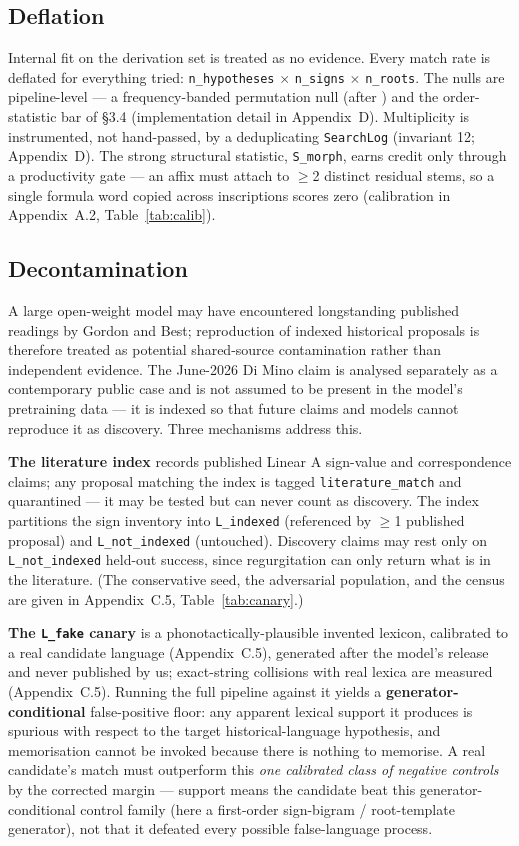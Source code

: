 \subsection{Deflation}

Internal fit on the derivation set is treated as no evidence. Every match
rate is deflated for everything tried: \texttt{n\_hypotheses} $\times$
\texttt{n\_signs} $\times$ \texttt{n\_roots}. The nulls are pipeline-level
--- a frequency-banded permutation null (after \citealp{packard1974}) and
the order-statistic bar of \S3.4 (implementation detail in Appendix~D).
Multiplicity is instrumented, not hand-passed, by a deduplicating
\texttt{SearchLog} (invariant 12; Appendix~D). The strong structural statistic,
\texttt{S\_morph}, earns credit only through a productivity gate --- an
affix must attach to $\ge$2 distinct residual stems, so a single formula
word copied across inscriptions scores zero (calibration in
Appendix~A.2, Table~\ref{tab:calib}).

\subsection{Decontamination}

A large open-weight model may have encountered longstanding published
readings by Gordon and Best; reproduction of indexed historical proposals
is therefore treated as potential shared-source contamination rather than
independent evidence. The June-2026 Di Mino claim is analysed separately
as a contemporary public case and is not assumed to be present in the
model's pretraining data --- it is indexed so that future claims and
models cannot reproduce it as discovery. Three mechanisms address this.

\textbf{The literature index} records published Linear A sign-value and
correspondence claims; any proposal matching the index is tagged
\texttt{literature\_match} and quarantined --- it may be tested but can
never count as discovery. The index partitions the sign inventory into
\texttt{L\_indexed} (referenced by $\ge$1 published proposal) and
\texttt{L\_not\_indexed} (untouched). Discovery claims may rest only on
\texttt{L\_not\_indexed} held-out success, since regurgitation can only
return what is in the literature. (The conservative seed, the adversarial
population, and the census are given in Appendix~C.5,
Table~\ref{tab:canary}.)

\textbf{The \texttt{L\_fake} canary} is a phonotactically-plausible
invented lexicon, calibrated to a real candidate language
(Appendix~C.5), generated after the model's release and never published
by us; exact-string collisions with real lexica are measured
(Appendix~C.5). Running the full pipeline
against it yields a \textbf{generator-conditional} false-positive floor:
any apparent lexical support it produces is spurious with respect to the
target historical-language hypothesis, and memorisation cannot
be invoked because there is nothing to memorise. A real candidate's match
must outperform this \emph{one calibrated class of negative controls} by
the corrected margin --- support means the candidate beat this
generator-conditional control family (here a first-order sign-bigram /
root-template generator), not that it defeated every possible false-language
process.

